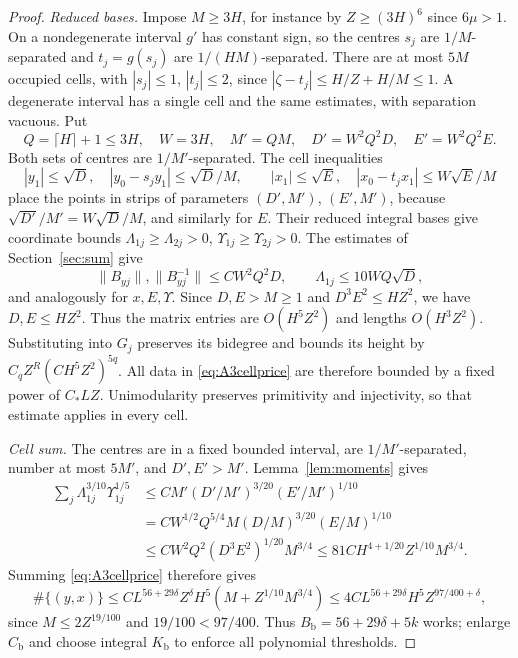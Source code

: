 \documentclass[11pt,reqno]{amsart}
\theoremstyle{definition}
\theoremstyle{remark}
\numberwithin{equation}{section}
\begin{document}
\begin{proof}
\emph{Reduced bases.}
Impose $M\ge3H$, for instance by $Z\ge(3H)^6$ since $6\mu>1$.
On a nondegenerate interval $g'$ has constant sign, so the centres
$s_j$ are $1/M$-separated and $t_j=g(s_j)$ are $1/(HM)$-separated.
There are at most $5M$ occupied cells, with $|s_j|\le1$, $|t_j|\le2$,
since $|\zeta-t_j|\le H/Z+H/M\le1$. A degenerate interval has a
single cell and the same estimates, with separation vacuous.
Put
\[
 Q=\lceil H\rceil+1\le3H,\quad W=3H,\quad
 M'=QM,\quad D'=W^2Q^2D,\quad E'=W^2Q^2E.
\]
Both sets of centres are $1/M'$-separated. The cell inequalities
\[
 |y_1|\le\sqrt D,\quad|y_0-s_jy_1|\le\sqrt D/M,\qquad
 |x_1|\le\sqrt E,\quad|x_0-t_jx_1|\le W\sqrt E/M
\]
place the points in strips of parameters $(D',M')$, $(E',M')$, because
$\sqrt{D'}/M'=W\sqrt D/M$, and similarly for $E$.
Their reduced integral bases give coordinate bounds
$\Lambda_{1j}\ge\Lambda_{2j}>0$, $\Upsilon_{1j}\ge\Upsilon_{2j}>0$.
The estimates of Section~\ref{sec:sum} give
\[
 \|B_{yj}\|,\|B_{yj}^{-1}\|\le CW^2Q^2D,\qquad
 \Lambda_{1j}\le10WQ\sqrt D,
\]
and analogously for $x,E,\Upsilon$. Since $D,E>M\ge1$ and
$D^3E^2\le HZ^2$, we have $D,E\le HZ^2$. Thus the matrix entries
are $O(H^5Z^2)$ and lengths $O(H^3Z^2)$. Substituting into $G_j$
preserves its bidegree and bounds its height by
$C_qZ^R(CH^5Z^2)^{5q}$. All data in \eqref{eq:A3cellprice} are therefore
bounded by a fixed power of $C_*LZ$. Unimodularity preserves primitivity
and injectivity, so that estimate applies in every cell.

\emph{Cell sum.}
The centres are in a fixed bounded interval, are $1/M'$-separated,
number at most $5M'$, and $D',E'>M'$. Lemma~\ref{lem:moments} gives
\begin{align*}
 \sum_j\Lambda_{1j}^{3/10}\Upsilon_{1j}^{1/5}
 &\le CM'(D'/M')^{3/20}(E'/M')^{1/10}\\
 &=CW^{1/2}Q^{5/4}M(D/M)^{3/20}(E/M)^{1/10}\\
 &\le CW^2Q^2(D^3E^2)^{1/20}M^{3/4}
 \le81CH^{4+1/20}Z^{1/10}M^{3/4}.
\end{align*}
Summing \eqref{eq:A3cellprice} therefore gives
\[
 \#\{(y,x)\}\le CL^{56+29\delta}Z^\delta H^5
 (M+Z^{1/10}M^{3/4})\le4CL^{56+29\delta}H^5Z^{97/400+\delta},
\]
since $M\le2Z^{19/100}$ and $19/100<97/400$.
Thus $B_{\mathrm b}=56+29\delta+5k$ works; enlarge $C_{\mathrm b}$
and choose integral $K_{\mathrm b}$ to enforce all polynomial thresholds.
\end{proof}
\end{document}
